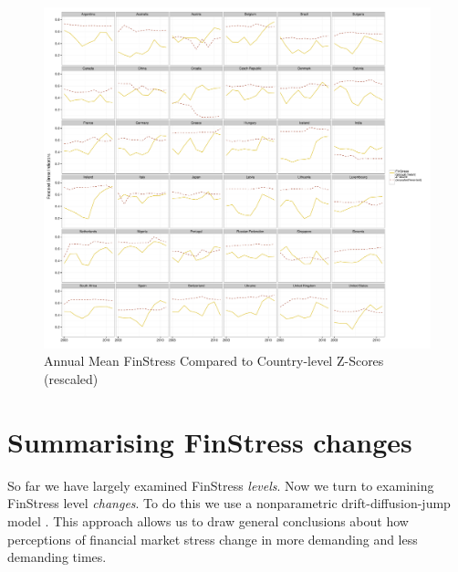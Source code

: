 \documentclass[]{article}
\begin{document}
\begin{figure}

    \caption{Annual Mean FinStress Compared to Country-level Z-Scores (rescaled)}
    \label{z_score}

    \begin{center}
        \includegraphics[scale=0.4]{figures/compare_to_z-score.pdf}
    \end{center}

\end{figure}

\section{Summarising FinStress changes}

So far we have largely examined FinStress \emph{levels}. Now we turn to examining  FinStress level \emph{changes}. To do this we use a nonparametric drift-diffusion-jump model \citep[DDJ,][]{Carpenter2011,Dakos2012}. This approach allows us to draw general conclusions about how perceptions of financial market stress change in more demanding and less demanding times.
\end{document}
